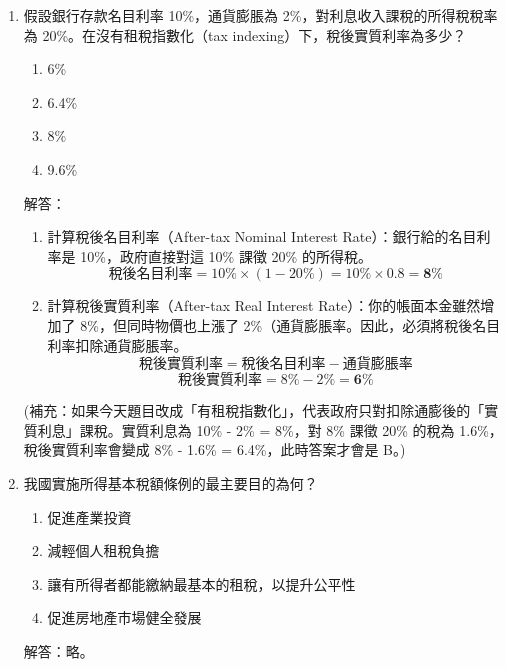 \documentclass[12pt, a4paper]{article}
\begin{document}
\begin{enumerate}
    \item 假設銀行存款名目利率 10\%，通貨膨脹為 2\%，對利息收入課稅的所得稅稅率為 20\%。在沒有租稅指數化（tax indexing）下，稅後實質利率為多少？
    \begin{enumerate}[label=\Alph*.]
        \item 6\%
        \item 6.4\%
        \item 8\%
        \item 9.6\%
    \end{enumerate}
    解答：
    \begin{enumerate}[1.]
        \item 計算稅後名目利率（After-tax Nominal Interest Rate）：銀行給的名目利率是 10\%，政府直接對這 10\% 課徵 20\% 的所得稅。
        \[
        \text{稅後名目利率} = 10\% \times (1 - 20\%) = 10\% \times 0.8 = \mathbf{8\%}
        \]
        \item 計算稅後實質利率（After-tax Real Interest Rate）：你的帳面本金雖然增加了 8\%，但同時物價也上漲了 2\%（通貨膨脹率。因此，必須將稅後名目利率扣除通貨膨脹率。
        \[
        \text{稅後實質利率} = \text{稅後名目利率} - \text{通貨膨脹率}
        \]
        \[
        \text{稅後實質利率} = 8\% - 2\% = \mathbf{6\%}
        \]
    \end{enumerate}
    (補充：如果今天題目改成「有租稅指數化」，代表政府只對扣除通膨後的「實質利息」課稅。實質利息為 10\% - 2\% = 8\%，對 8\% 課徵 20\% 的稅為 1.6\%，稅後實質利率會變成 8\% - 1.6\% = 6.4\%，此時答案才會是 B。)

    \newpage

    \item 我國實施所得基本稅額條例的最主要目的為何？
    \begin{enumerate}[label=\Alph*.]
        \item 促進產業投資
        \item 減輕個人租稅負擔
        \item 讓有所得者都能繳納最基本的租稅，以提升公平性
        \item 促進房地產市場健全發展
    \end{enumerate}
    解答：略。


\end{enumerate}
\end{document}
